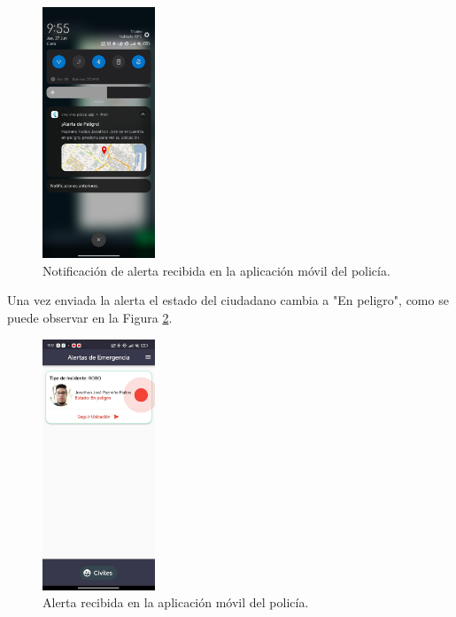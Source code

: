 \begin{figure}[H]
    \centering
    \includegraphics[width=0.3\textwidth]{chapters/III-resultados-y-discusion/resources/images/notificacion-recibida-policia.jpeg}
    \caption{Notificación de alerta recibida en la aplicación móvil del policía.}
    \label{fig:notificacion-recibida-movil-policia}
\end{figure}

Una vez enviada la alerta el estado del ciudadano cambia a "En peligro", como se puede observar en la Figura \ref{fig:alerta-recibida-movil-policia}.

\begin{figure}[H]
    \centering
    \includegraphics[width=0.3\textwidth]{chapters/III-resultados-y-discusion/resources/images/alerta-recibida-policia.png}
    \caption{Alerta recibida en la aplicación móvil del policía.}
    \label{fig:alerta-recibida-movil-policia}
\end{figure}

